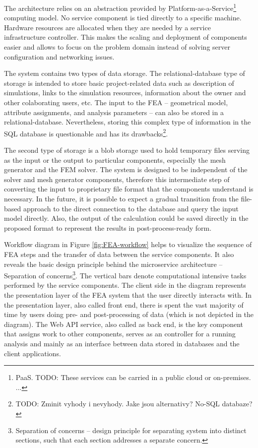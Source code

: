 The architecture relies on an abstraction provided by Platform-as-a-Service\footnote{PaaS. TODO: These services can be carried in a public cloud or on-premises. ...} computing model. No service component is tied directly to a specific machine. Hardware resources are allocated when they are needed by a service infrastructure controller. This makes the scaling and deployment of components easier and allows to focus on the problem domain instead of solving server configuration and networking issues.

The system contains two types of data storage. The relational-database type of storage is intended to store basic project-related data such as description of simulations, links to the simulation resources, information about the owner and other colaborating users, etc. The input to the FEA -- geometrical model, attribute assignments, and analysis parameters -- can also be stored in a relational-database. Nevertheless, storing this complex type of information in the SQL database is questionable and has its drawbacks\footnote{TODO: Zminit vyhody i nevyhody. Jake jsou alternativy? No-SQL databaze?}.

The second type of storage is a blob storage used to hold temporary files serving as the input or the output to particular components, especially the mesh generator and the FEM solver. The system is designed to be independent of the solver and mesh generator components, therefore this intermediate step of converting the input to proprietary file format that the components understand is necessary. In the future, it is possible to expect a gradual transition from the file-based approach to the direct connection to the database and query the input model directly. Also, the output of the calculation could be saved directly in the proposed format to represent the results in post-process-ready form.

Workflow diagram in Figure \ref{fig:FEA-workflow} helps to visualize the sequence of FEA steps and the transfer of data between the service components. It also reveals the basic design principle behind the microservice architecture -- Separation of concerns\footnote{Separation of concerns -- design principle for separating system into distinct sections, such that each section addresses a separate concern.}. The vertical bars denote computational intensive tasks performed by the service components. The client side in the diagram represents the presentation layer of the FEA system that the user directly interacts with. In the presentation layer, also called front end, there is spent the vast majority of time by users doing pre- and post-processing of data (which is not depicted in the diagram). The Web API service, also called as back end, is the key component that assigns work to other components, serves as an controller for a running analysis and mainly as an interface between data stored in databases and the client applications.

